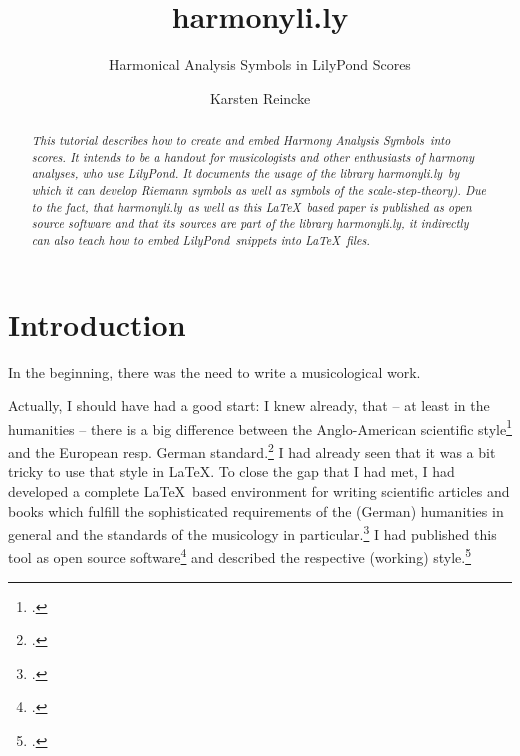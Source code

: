 \documentclass[
  DIV=calc,
  BCOR=5mm,
  12pt,
  headings=small,
  oneside,
  abstract=true,
  toc=bib,
  xcolor=dvipsnames,
  openany,
  english]{scrartcl}
\newcommand{\acc}[0]{\textit}
\newcommand{\hlyn}[0]{\textit{harmonyli.ly}}
\newcommand{\lily}[0]{\textit{LilyPond}}
\newcommand{\has}[1]{\textit{Harmony Analysis Symbol#1}}
\begin{document}
\nocite{*}

\titlehead{Tutorial}
\subject{Release }
\title{harmonyli.ly}
\subtitle{Harmonical Analysis Symbols in LilyPond Scores}
\author{Karsten Reincke}


\maketitle

\begin{abstract}
\noindent \itshape
This tutorial describes how to create and embed \has{s}\ into scores. It
intends to be a handout for musicologists and other enthusiasts of harmony
analyses, who use \lily. It documents the usage of the library \hlyn\ by which
it can develop \acc{Riemann} symbols as well as symbols of the
\acc{scale-step-theory}). Due to the fact, that \hlyn\ as well as this \LaTeX\
based paper is published as open source software and that its sources are part
of the library \hlyn, it indirectly can also teach how to embed \lily\ snippets
into \LaTeX\ files.
\end{abstract}


\footnotesize
\tableofcontents

\normalsize

\section{Introduction}

In the beginning, there was the need to write a musicological work.

Actually, I should have had a good start: I knew already, that -- at least in
the humanities -- there is a big difference between the Anglo-American
scientific style\footcite[cf.][619ff]{ChMaStyle2010a} and the European resp.
German standard.\footcite[cf.][147ff]{Theisen2013a} I had already seen that it
was a bit tricky to use that style in \LaTeX. To close the gap that I had met, I
had developed a complete \LaTeX\ based environment for writing scientific
articles and books which fulfill the sophisticated requirements of the (German)
humanities in general and the standards of the musicology in
particular.\footcite[cf.][\nopage wp]{reincke2018a} I had published this tool as
open source software\footcite[cf.][\nopage wp]{reincke2018c} and described the
respective (working) style.\footcite[cf.][\nopage]{reincke2018b}
\end{document}
